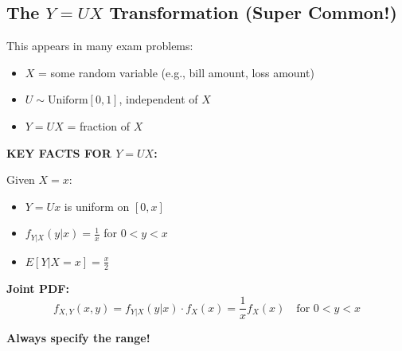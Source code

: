 \documentclass[10pt,letterpaper]{article}
\begin{document}
\subsection{The $Y = UX$ Transformation (Super Common!)}

This appears in many exam problems:

\begin{itemize}
  \item $X$ = some random variable (e.g., bill amount, loss amount)
  \item $U \sim \text{Uniform}[0,1]$, independent of $X$
  \item $Y = UX$ = fraction of $X$
\end{itemize}

\begin{formulabox}
\textbf{KEY FACTS FOR $Y = UX$:}

\vspace{0.2cm}

Given $X = x$:
\begin{itemize}
  \item $Y = Ux$ is uniform on $[0, x]$
  \item $f_{Y|X}(y|x) = \frac{1}{x}$ for $0 < y < x$
  \item $E[Y|X=x] = \frac{x}{2}$
\end{itemize}

\textbf{Joint PDF:}
\[
f_{X,Y}(x,y) = f_{Y|X}(y|x) \cdot f_X(x) = \frac{1}{x} f_X(x) \quad \text{for } 0 < y < x
\]

\textbf{Always specify the range!}
\end{formulabox}
\end{document}
